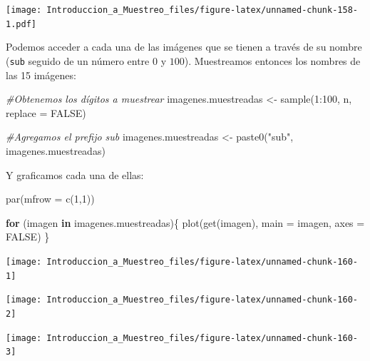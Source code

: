 \documentclass[
]{book}
\newenvironment{Shaded}{\begin{snugshade}}{\end{snugshade}}
\newcommand{\AttributeTok}[1]{\textcolor[rgb]{0.77,0.63,0.00}{#1}}
\newcommand{\CommentTok}[1]{\textcolor[rgb]{0.56,0.35,0.01}{\textit{#1}}}
\newcommand{\ConstantTok}[1]{\textcolor[rgb]{0.00,0.00,0.00}{#1}}
\newcommand{\ControlFlowTok}[1]{\textcolor[rgb]{0.13,0.29,0.53}{\textbf{#1}}}
\newcommand{\DecValTok}[1]{\textcolor[rgb]{0.00,0.00,0.81}{#1}}
\newcommand{\FunctionTok}[1]{\textcolor[rgb]{0.00,0.00,0.00}{#1}}
\newcommand{\NormalTok}[1]{#1}
\newcommand{\OtherTok}[1]{\textcolor[rgb]{0.56,0.35,0.01}{#1}}
\newcommand{\SpecialCharTok}[1]{\textcolor[rgb]{0.00,0.00,0.00}{#1}}
\newcommand{\StringTok}[1]{\textcolor[rgb]{0.31,0.60,0.02}{#1}}
\begin{document}
\texttt{[image: Introduccion\_a\_Muestreo\_files/figure-latex/unnamed-chunk-158-1.pdf]}

Podemos acceder a cada una de las imágenes que se tienen a través de su nombre (\texttt{sub} seguido de un número entre \(0\) y \(100\)). Muestreamos entonces los nombres de las 15 imágenes:

\begin{Shaded}
\begin{Highlighting}[]
\CommentTok{\#Obtenemos los dígitos a muestrear}
\NormalTok{imagenes.muestreadas }\OtherTok{\textless{}{-}} \FunctionTok{sample}\NormalTok{(}\DecValTok{1}\SpecialCharTok{:}\DecValTok{100}\NormalTok{, n, }\AttributeTok{replace =} \ConstantTok{FALSE}\NormalTok{)}

\CommentTok{\#Agregamos el prefijo sub}
\NormalTok{imagenes.muestreadas }\OtherTok{\textless{}{-}} \FunctionTok{paste0}\NormalTok{(}\StringTok{"sub"}\NormalTok{, imagenes.muestreadas)}
\end{Highlighting}
\end{Shaded}

Y graficamos cada una de ellas:

\begin{Shaded}
\begin{Highlighting}[]
\FunctionTok{par}\NormalTok{(}\AttributeTok{mfrow =} \FunctionTok{c}\NormalTok{(}\DecValTok{1}\NormalTok{,}\DecValTok{1}\NormalTok{))}

\ControlFlowTok{for}\NormalTok{ (imagen }\ControlFlowTok{in}\NormalTok{ imagenes.muestreadas)\{}
  \FunctionTok{plot}\NormalTok{(}\FunctionTok{get}\NormalTok{(imagen),  }\AttributeTok{main =}\NormalTok{ imagen, }\AttributeTok{axes =} \ConstantTok{FALSE}\NormalTok{)}
\NormalTok{\}}
\end{Highlighting}
\end{Shaded}

\begin{center}\texttt{[image: Introduccion\_a\_Muestreo\_files/figure-latex/unnamed-chunk-160-1]} \end{center}

\begin{center}\texttt{[image: Introduccion\_a\_Muestreo\_files/figure-latex/unnamed-chunk-160-2]} \end{center}

\begin{center}\texttt{[image: Introduccion\_a\_Muestreo\_files/figure-latex/unnamed-chunk-160-3]} \end{center}
\end{document}
